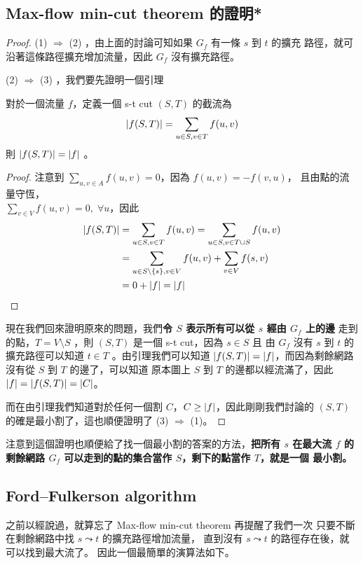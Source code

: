 \documentclass[a4paper,12pt]{book}
\begin{document}
\subsection{Max-flow min-cut theorem 的證明*}
\begin{proof}
  (1) $\Rightarrow$ (2) ，由上面的討論可知如果 $G_f$ 有一條 $s$ 到 $t$ 的擴充
  路徑，就可沿著這條路徑擴充增加流量，因此 $G_f$ 沒有擴充路徑。 
  
  (2) $\Rightarrow$ (3) ，我們要先證明一個引理
\begin{lemma}
  對於一個流量 $f$，定義一個 s-t cut $(S, T)$ 的截流為
  \[ \lvert f(S, T) \rvert = \sum_{u \in S, v \in T} f(u, v) \]
  則 $\lvert f(S, T) \rvert = \lvert f \rvert$ 。
\end{lemma}
\begin{proof}
  注意到 $\sum\limits_{u, v \in A} f(u, v) = 0$，因為 $f(u, v) = -f(v, u)$，
  且由點的流量守恆，\\$\sum\limits_{v \in V} f(u, v) = 0, \; \forall u$，因此
  \begin{align*}
    \lvert f(S, T) \rvert &= \sum_{u \in S, v \in T} f(u, v) 
    = \sum_{u \in S, v \in T \cup S} f(u, v) \\
    &= \sum_{u \in S \setminus \{s\}, v \in V} f(u, v)
     + \sum_{v \in V} f(s, v) \\
     &= 0 + \lvert f \rvert = \lvert f \rvert 
  \end{align*} 
\end{proof}
現在我們回來證明原來的問題，我們{\bf 令 $S$ 表示所有可以從 $s$ 經由 $G_f$ 上的邊}%
走到的點，$T = V \setminus S$ ，則 $(S, T)$ 是一個 s-t cut，因為 $s \in S$ 且
由 $G_f$ 沒有 $s$ 到 $t$ 的擴充路徑可以知道 $t \in T$ 。由引理我們可以知道
$\lvert f(S, T) \rvert = \lvert f \rvert$，而因為剩餘網路沒有從 $S$ 到 $T$ 的邊了，可以知道
原本圖上 $S$ 到 $T$ 的邊都以經流滿了，因此 $\lvert f \rvert = \lvert f(S, T) \rvert = \lvert C \rvert$。

而在由引理我們知道對於任何一個割 $C$，$C \geq \lvert f \rvert$，因此剛剛我們討論的
$(S, T)$的確是最小割了，這也順便證明了 (3) $\Rightarrow$ (1)。
\end{proof}
注意到這個證明也順便給了找一個最小割的答案的方法，{\bf 把所有 $s$ 在最大流 $f$
  的剩餘網路 $G_f$ 可以走到的點的集合當作 $S$，剩下的點當作 $T$，就是一個
  最小割。}

\subsection{Ford–Fulkerson algorithm}
之前以經說過，就算忘了 Max-flow min-cut theorem 再提醒了我們一次
只要不斷在剩餘網路中找 $s \leadsto t$ 的擴充路徑增加流量，
直到沒有 $s \leadsto t$ 的路徑存在後，就可以找到最大流了。
因此一個最簡單的演算法如下。
\end{document}
